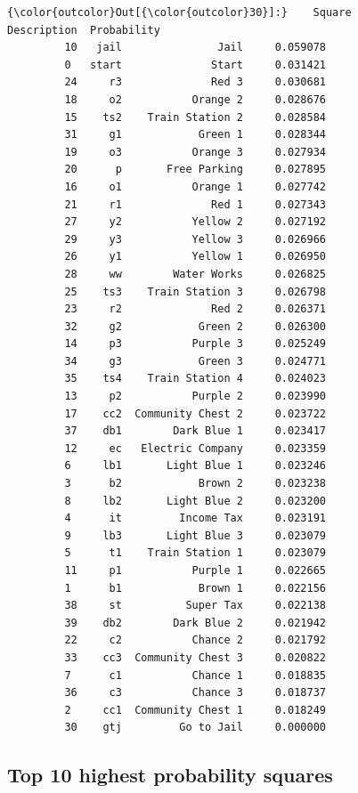 \documentclass[11pt]{article}
\begin{document}
\begin{Verbatim}[commandchars=\\\{\}]
{\color{outcolor}Out[{\color{outcolor}30}]:}    Square        Description  Probability
         10   jail               Jail     0.059078
         0   start              Start     0.031421
         24     r3              Red 3     0.030681
         18     o2           Orange 2     0.028676
         15    ts2    Train Station 2     0.028584
         31     g1            Green 1     0.028344
         19     o3           Orange 3     0.027934
         20      p       Free Parking     0.027895
         16     o1           Orange 1     0.027742
         21     r1              Red 1     0.027343
         27     y2           Yellow 2     0.027192
         29     y3           Yellow 3     0.026966
         26     y1           Yellow 1     0.026950
         28     ww        Water Works     0.026825
         25    ts3    Train Station 3     0.026798
         23     r2              Red 2     0.026371
         32     g2            Green 2     0.026300
         14     p3           Purple 3     0.025249
         34     g3            Green 3     0.024771
         35    ts4    Train Station 4     0.024023
         13     p2           Purple 2     0.023990
         17    cc2  Community Chest 2     0.023722
         37    db1        Dark Blue 1     0.023417
         12     ec   Electric Company     0.023359
         6     lb1       Light Blue 1     0.023246
         3      b2            Brown 2     0.023238
         8     lb2       Light Blue 2     0.023200
         4      it         Income Tax     0.023191
         9     lb3       Light Blue 3     0.023079
         5      t1    Train Station 1     0.023079
         11     p1           Purple 1     0.022665
         1      b1            Brown 1     0.022156
         38     st          Super Tax     0.022138
         39    db2        Dark Blue 2     0.021942
         22     c2           Chance 2     0.021792
         33    cc3  Community Chest 3     0.020822
         7      c1           Chance 1     0.018835
         36     c3           Chance 3     0.018737
         2     cc1  Community Chest 1     0.018249
         30    gtj         Go to Jail     0.000000
\end{Verbatim}
            
    \hypertarget{top-10-highest-probability-squares}{%
\subsection{Top 10 highest probability
squares}\label{top-10-highest-probability-squares}}
\end{document}
